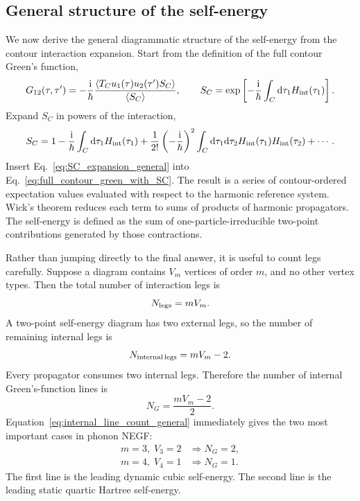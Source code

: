 \subsection{General structure of the self-energy}
We now derive the general diagrammatic structure of the self-energy from the contour interaction expansion. Start from the definition of the full contour Green's function,
\begin{equation}
    G_{12}(\tau,\tau')
    =
    -\frac{\mathrm{i}}{\hbar}
    \frac{\left\langle T_C u_1(\tau)u_2(\tau') S_C \right\rangle}{\left\langle S_C \right\rangle},
    \qquad
    S_C = \exp\left[ -\frac{\mathrm{i}}{\hbar}\int_C \mathrm{d}\tau_1 H_{\rm int}(\tau_1) \right].
    \label{eq:full_contour_green_with_SC}
\end{equation}
Expand $S_C$ in powers of the interaction,
\begin{equation}
    S_C = 1 - \frac{\mathrm{i}}{\hbar}\int_C \mathrm{d}\tau_1 H_{\rm int}(\tau_1)
    + \frac{1}{2!}\left( -\frac{\mathrm{i}}{\hbar} \right)^2\int_C \mathrm{d}\tau_1\mathrm{d}\tau_2 H_{\rm int}(\tau_1)H_{\rm int}(\tau_2) + \cdots.
    \label{eq:SC_expansion_general}
\end{equation}
Insert Eq.~\eqref{eq:SC_expansion_general} into Eq.~\eqref{eq:full_contour_green_with_SC}. The result is a series of contour-ordered expectation values evaluated with respect to the harmonic reference system. Wick's theorem reduces each term to sums of products of harmonic propagators. The self-energy is defined as the sum of one-particle-irreducible two-point contributions generated by those contractions.

Rather than jumping directly to the final answer, it is useful to count legs carefully. Suppose a diagram contains $V_m$ vertices of order $m$, and no other vertex types. Then the total number of interaction legs is
\begin{equation}
    N_{\rm legs} = mV_m.
\end{equation}
A two-point self-energy diagram has two external legs, so the number of remaining internal legs is
\begin{equation}
    N_{\rm internal\,legs} = mV_m - 2.
\end{equation}
Every propagator consumes two internal legs. Therefore the number of internal Green's-function lines is
\begin{equation}
    N_G = \frac{mV_m-2}{2}.
    \label{eq:internal_line_count_general}
\end{equation}
Equation~\eqref{eq:internal_line_count_general} immediately gives the two most important cases in phonon NEGF:
\begin{align}
    m=3,\;V_3=2 &\Rightarrow N_G = 2, \\
    m=4,\;V_4=1 &\Rightarrow N_G = 1.
\end{align}
The first line is the leading dynamic cubic self-energy. The second line is the leading static quartic Hartree self-energy.

